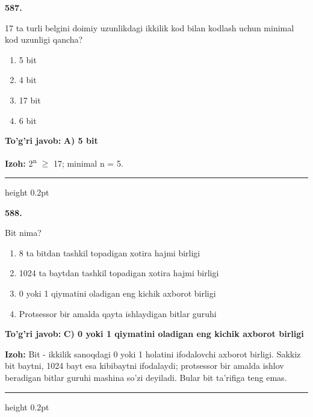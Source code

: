 \documentclass[10pt,a4paper,oneside]{article}
\begin{document}
\noindent\textbf{\color{ink}587.}
\par
17 ta turli belgini doimiy uzunlikdagi ikkilik kod bilan kodlash uchun minimal kod uzunligi qancha?
\begin{enumerate}[label=\Alph*),leftmargin=9mm]
\item 5 bit
\item 4 bit
\item 17 bit
\item 6 bit
\end{enumerate}
\begin{tcolorbox}[enhanced,breakable,colback=teal!4,colframe=teal!50!black,boxrule=0.5pt,arc=1.1mm,left=3mm,right=3mm,top=1.7mm,bottom=1.7mm,before skip=2mm,after skip=2mm]
\textbf{\color{teal}To'g'ri javob:} \textbf{A) 5 bit}
\par\smallskip
\textbf{Izoh:} 2\textsuperscript{n} \ensuremath{\geq} 17; minimal n = 5.
\end{tcolorbox}
\vspace{2mm}\hrule height 0.2pt \vspace{3mm}

\noindent\textbf{\color{ink}588.}
\par
Bit nima?
\begin{enumerate}[label=\Alph*),leftmargin=9mm]
\item 8 ta bitdan tashkil topadigan xotira hajmi birligi
\item 1024 ta baytdan tashkil topadigan xotira hajmi birligi
\item 0 yoki 1 qiymatini oladigan eng kichik axborot birligi
\item Protsessor bir amalda qayta ishlaydigan bitlar guruhi
\end{enumerate}
\begin{tcolorbox}[enhanced,breakable,colback=teal!4,colframe=teal!50!black,boxrule=0.5pt,arc=1.1mm,left=3mm,right=3mm,top=1.7mm,bottom=1.7mm,before skip=2mm,after skip=2mm]
\textbf{\color{teal}To'g'ri javob:} \textbf{C) 0 yoki 1 qiymatini oladigan eng kichik axborot birligi}
\par\smallskip
\textbf{Izoh:} Bit - ikkilik sanoqdagi 0 yoki 1 holatini ifodalovchi axborot birligi. Sakkiz bit baytni, 1024 bayt esa kibibaytni ifodalaydi; protsessor bir amalda ishlov beradigan bitlar guruhi mashina so'zi deyiladi. Bular bit ta'rifiga teng emas.
\end{tcolorbox}
\vspace{2mm}\hrule height 0.2pt \vspace{3mm}
\end{document}
